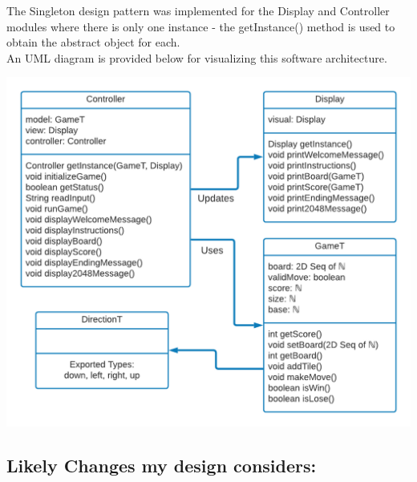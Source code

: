 \documentclass[12pt]{article}
\begin{document}
The Singleton design pattern was implemented for the Display and Controller modules where there is only one instance - the getInstance() method is used to obtain the abstract object for each. \\

An UML diagram is provided below for visualizing this software architecture.\\
\begin{center}
    \includegraphics[scale=0.65]{UML.png}
\end{center}

\newpage

\subsection*{Likely Changes my design considers:}
\end{document}
